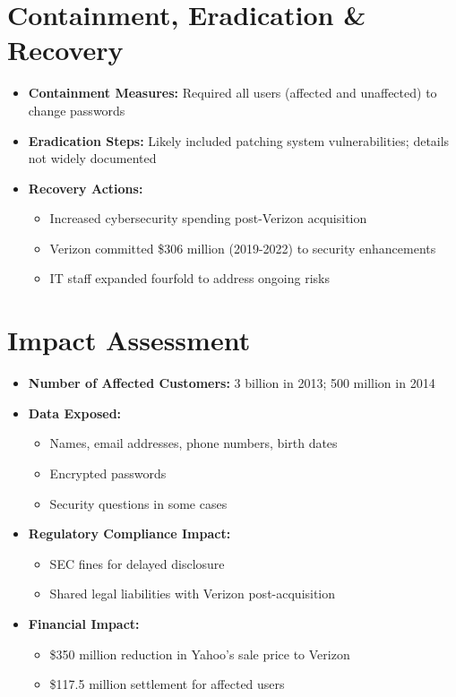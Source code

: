 \documentclass[11pt]{book}
\begin{document}
\section{Containment, Eradication \& Recovery}
\begin{itemize}
    \item \textbf{Containment Measures:} Required all users (affected and unaffected) to change passwords
    \item \textbf{Eradication Steps:} Likely included patching system vulnerabilities; details not widely documented
    \item \textbf{Recovery Actions:} 
    \begin{itemize}
        \item Increased cybersecurity spending post-Verizon acquisition
        \item Verizon committed \$306 million (2019-2022) to security enhancements
        \item IT staff expanded fourfold to address ongoing risks
    \end{itemize}
\end{itemize}

\section{Impact Assessment}
\begin{itemize}
    \item \textbf{Number of Affected Customers:} 3 billion in 2013; 500 million in 2014
    \item \textbf{Data Exposed:} 
    \begin{itemize}
        \item Names, email addresses, phone numbers, birth dates
        \item Encrypted passwords
        \item Security questions in some cases
    \end{itemize}
    \item \textbf{Regulatory Compliance Impact:} 
    \begin{itemize}
        \item SEC fines for delayed disclosure
        \item Shared legal liabilities with Verizon post-acquisition
    \end{itemize}
    \item \textbf{Financial Impact:} 
    \begin{itemize}
        \item \$350 million reduction in Yahoo’s sale price to Verizon
        \item \$117.5 million settlement for affected users
    \end{itemize}
\end{itemize}
\end{document}
